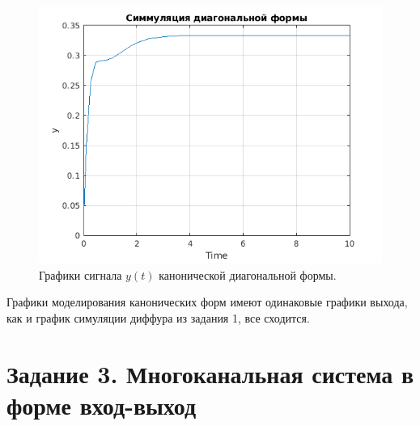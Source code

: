\begin{enumerate}
\begin{figure}[htbp]
        \label{fig:task2_slx_diag}
    \end{figure}
    \begin{figure}[htbp]
        \centering
        \includegraphics[width=0.7\linewidth]{figs/task_2_out_diag_y.png}
        \caption{Графики сигнала $y(t)$ канонической диагональной формы.}
        \label{fig:task2_out_diag_y}
    \end{figure}
\end{enumerate}

Графики моделирования канонических форм имеют одинаковые графики выхода,
как и график симуляции диффура из задания 1, все сходится.



\section*{Задание 3. Многоканальная система в форме вход-выход}

